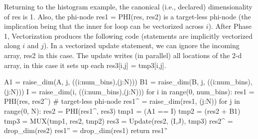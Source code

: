 \begin{comment}
\begin{algorithmic}
\STATE 1. $\texttt{A}_2 = update(\texttt{A}_0; \stackrel{\rightarrow}{i}, \mathit{ADD\_SIMD}(\texttt{B}_0[\stackrel{\rightarrow}i],[10,...])$ \COMMENT{Fully vectorized, size N.}
\STATE FOR i=0; i<N; i++; \COMMENT{ MOTION loop }
\STATE 2. $\texttt{B}_1$ = $\phi(\texttt{B}_0,\texttt{B}_2)$
\STATE 3. $\texttt{C}_1$ = $\phi(\texttt{C}_0,\texttt{C}_2)$
\STATE 4. $\texttt{D}_1$ = $\phi(\texttt{D}_0,\texttt{D}_2)$
\STATE 5. $\texttt{B}_2 = update(\texttt{B}_1, i, \mathit{MUL}(\texttt{A}_2[i], \texttt{D}_1[{i-1}])$
\STATE 6. $\texttt{C}_2 = update(\texttt{C}_1, i, \mathit{MUL}(\texttt{A}_2[i], \texttt{D}_1[{i-1}])$
\STATE 7. $\texttt{D}_2 = update(\texttt{D}_1, i, \mathit{MUL}(\texttt{B}_2[i], \texttt{C}_1[i])$
\end{algorithmic}
\end{comment}

\begin{comment}
\paragraph{Example 2} Now consider the MPC Source of Histogram:

{\small
\begin{pythonn}
for i in range(0, num_bins):
  res1 = PHI(res, res2)
  for j in range(0, N):
    res2 = PHI(res1, res3)
    tmp1 = (A[j] == i)
    tmp2 = (res2[i] + B[j])
    tmp3 = MUX(tmp1, res2[i], tmp2)
    res3 = Update(res2, i, tmp3)
return res1
\end{pythonn}
}
\end{comment}

Returning to the histogram example, the canonical (i.e., declared) dimensionality of {\sf res} is 1. Also, the phi-node {\sf res1 = PHI(res, res2)} is a target-less phi-node (the implication being that the inner for loop can be vectorized across $i$). After Phase 1, Vectorization produces the following code (statements are implicitly vectorized along $i$ and $j$). In a vectorized update statement, we can ignore the incoming array, {\sf res2} in this case. The update writes (in parallel) all locations of the 2-d array, in this case it sets up each {\sf res3[i,j] = tmp3[i,j]}.

{\small
\begin{pythonn}
A1 = raise_dim(A, j, ((i:num_bins),(j:N)))
B1 = raise_dim(B, j, ((i:num_bins),(j:N)))
I = raise_dim(i, ((i:num_bins),(j:N)))
for i in range(0, num_bins):
   res1 = PHI(res, res2^) # target-less phi-node
   res1^ = raise_dim(res1, (j:N))
   for j in range(0, N):
     res2 = PHI(res1^, res3)
     tmp1 = (A1 == I)
     tmp2 = (res2 + B1)
     tmp3 = MUX(tmp1, res2, tmp2)
     res3 = Update(res2, (I,J), tmp3)
   res2^ = drop_dim(res2)
res1'' = drop_dim(res1)
return res1''
\end{pythonn}
}

